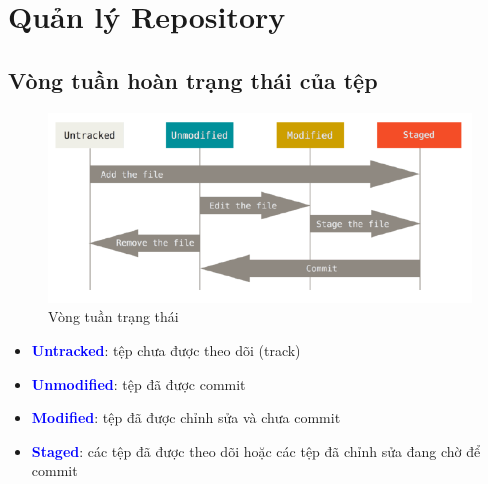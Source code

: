 \documentclass[12pt,a4paper]{report}
\begin{document}
\section{Quản lý Repository}

\subsection{Vòng tuần hoàn trạng thái của tệp}

\begin{figure}[!ht]
	\centering
	\includegraphics[width=0.8\linewidth]{screenshot006}
	\caption{Vòng tuần trạng thái}
	\label{fig:screenshot006}
	\end{figure}
\begin{itemize}
\item \textcolor{blue}{\bf Untracked}: tệp chưa được theo dõi (track)
\item \textcolor{blue}{\bf Unmodified}: tệp đã được commit
\item \textcolor{blue}{\bf Modified}: tệp đã được chỉnh sửa và chưa commit
\item \textcolor{blue}{\bf Staged}: các tệp đã được theo dõi hoặc các tệp đã chỉnh sửa đang chờ để commit
\end{itemize}
\end{document}
